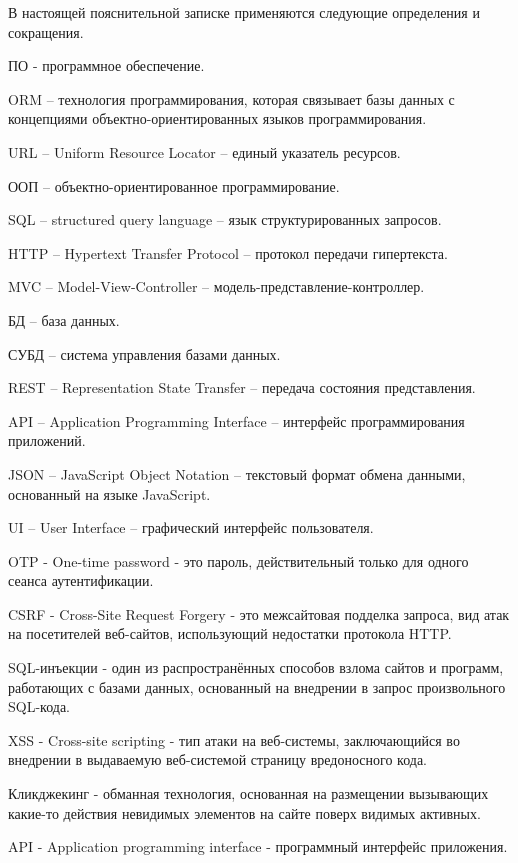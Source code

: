В настоящей пояснительной записке применяются следующие определения и сокращения.

ПО - программное обеспечение.

ORM – технология программирования, которая связывает базы данных с концепциями объектно-ориентированных языков программирования.

URL – Uniform Resource Locator – единый указатель ресурсов.

ООП – объектно-ориентированное программирование.

SQL – structured query language – язык структурированных запросов.

HTTP – Hypertext Transfer Protocol – протокол передачи гипертекста.

MVC – Model-View-Controller – модель-представление-контроллер.

БД – база данных.

СУБД – система управления базами данных.

REST – Representation State Transfer – передача состояния представления.

API – Application Programming Interface – интерфейс программирования приложений.

JSON – JavaScript Object Notation – текстовый формат обмена данными, основанный на языке JavaScript.

UI – User Interface – графический интерфейс пользователя.

OTP - One-time password - это пароль, действительный только для одного сеанса аутентификации.

CSRF - Cross-Site Request Forgery - это межсайтовая подделка запроса, вид атак на посетителей веб-сайтов, использующий недостатки протокола HTTP.

SQL-инъекции - один из распространённых способов взлома сайтов и программ, работающих с базами данных, основанный на внедрении в запрос произвольного SQL-кода.

XSS - Cross-site scripting - тип атаки на веб-системы, заключающийся во внедрении в выдаваемую веб-системой страницу вредоносного кода.

Кликджекинг - обманная технология, основанная на размещении вызывающих какие-то действия невидимых элементов на сайте поверх видимых активных.

API - Application programming interface - программный интерфейс приложения.

